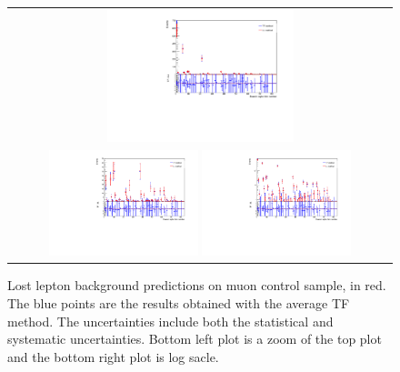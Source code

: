 \begin{figure}[hptb]
\begin{center}
\begin{tabular}{c}
\includegraphics[width=0.50\textwidth]{sections/mc4/Backgrounds/LostLepton/figures/v4_DataCardCampare_0_700_mu_cs.pdf}\\
\includegraphics[width=0.40\textwidth]{sections/mc4/Backgrounds/LostLepton/figures/v4_DataCardCampare_0_50_mu_cs.pdf}
\includegraphics[width=0.40\textwidth]{sections/mc4/Backgrounds/LostLepton/figures/v4_DataCardCampare_0_700_mu_cs_log.pdf}
\end{tabular}
\end{center}
\caption{Lost lepton background predictions on muon control sample, in red. The blue points are the results obtained with the average TF method. The uncertainties include both the statistical and systematic uncertainties. Bottom left plot is a zoom of the top plot and the bottom right plot is log sacle.}
\label{fig:LostLeptonResult_mu}
\end{figure}

